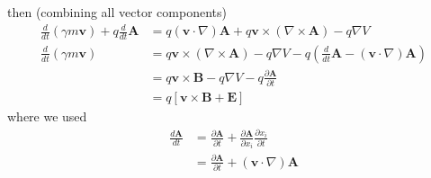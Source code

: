 \documentclass[../main.tex]{subfiles}
\begin{document}
then (combining all vector components)
\begin{align}
\frac{d}{dt}(\gamma m\mathbf{v})+q\frac{d}{dt}\mathbf{A}&=q(\mathbf{v}\cdot\nabla)\mathbf{A}+q\mathbf{v}\times(\nabla\times\mathbf{A})-q\nabla V\\
\frac{d}{dt}(\gamma m\mathbf{v})
&=q\mathbf{v}\times(\nabla\times\mathbf{A})-q\nabla V-q\left(\frac{d}{dt}\mathbf{A}-(\mathbf{v}\cdot\nabla)\mathbf{A}\right)\\
&=q\mathbf{v}\times\mathbf{B}-q\nabla V-q\frac{\partial\mathbf{A}}{\partial t}\\
&=q[\mathbf{v}\times\mathbf{B}+\mathbf{E}]
\end{align}
where we used
\begin{align}
\frac{d\mathbf{A}}{dt}
&=\frac{\partial\mathbf{A}}{\partial t}+\frac{\partial\mathbf{A}}{\partial x_i}\frac{\partial x_i}{\partial t}\\
&=\frac{\partial\mathbf{A}}{\partial t}+(\mathbf{v}\cdot\nabla)\mathbf{A}
\end{align}
\end{document}
